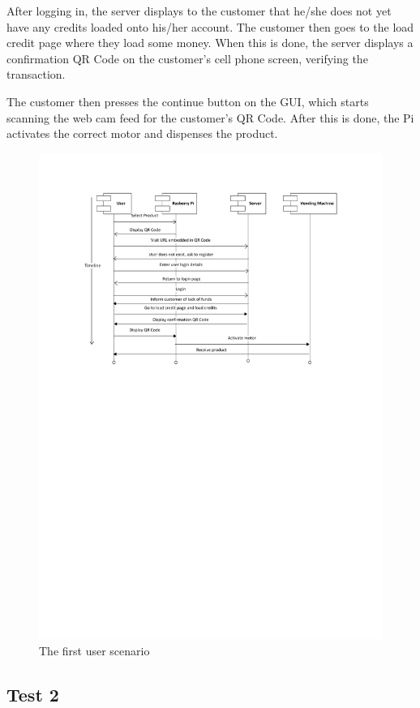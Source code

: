 After logging in, the server displays to the customer that he/she does not yet have any
credits loaded onto his/her account. The customer then goes to the load credit page where
they load some money. When this is done, the server displays a confirmation QR Code on
the customer's cell phone screen, verifying the transaction.

The customer then presses the continue button on the GUI, which starts scanning the web
cam feed for the customer's QR Code. After this is done, the Pi activates the correct
motor and dispenses the product.

\begin{figure}
 \centering 
 \includegraphics[clip=true, trim = 0 470 0 50,
 scale=0.7]{user_story_1}
 \caption{The first user scenario}
 \label{fig:test1}
\end{figure}

\subsection{Test 2}


